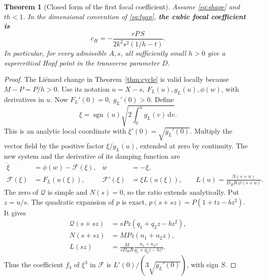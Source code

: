 \documentclass[12pt,a4paper,twoside,fleqn]{article}
\theoremstyle{journal}
\newtheorem{theorem}{Theorem}
\newcommand{\claim}[1]{{\normalfont\bfseries\boldmath #1}}
\newcommand{\dd}{\mathrm{d}}
\newcommand{\Q}{\mathcal Q}
\begin{document}
\begin{theorem}[Closed form of the first focal coefficient]\label{thm:focal}
Assume \eqref{eq:shape} and \(th<1\). In the dimensional convention of \eqref{eq:lyap}, \claim{the cubic focal coefficient is}
\begin{equation}\label{eq:closedc}
 c_H=-\frac{rP\,S}{2 k^2s^2(1/h-t)} .
\end{equation}
In particular, for every admissible \(A,s\), all sufficiently small \(h>0\) give a supercritical Hopf point in the transverse parameter \(D\).
\end{theorem}
\begin{proof}
The Li\'enard change in Theorem~\ref{thm:cycle} is valid locally because \(M-P=P/h>0\). Use its notation \(u=X-s,\ F_L(u),g_L(u),\phi(w)\), with derivatives in \(u\). Now \(F_L'(0)=0,\ g_L'(0)>0\). Define
\[
 \xi=\operatorname{sgn}(u)\sqrt{2\int_0^u g_L(v)\,\dd v}.
\]
This is an analytic local coordinate with \(\xi'(0)=\sqrt{g_L'(0)}\). Multiply the vector field by the positive factor \(\xi/g_L(u)\), extended at zero by continuity. The new system and the derivative of its damping function are
\begin{equation}\label{eq:odd}
 \begin{aligned}
 \dot\xi&=\phi(w)-\mathcal F(\xi), & \dot w&=-\xi,\\
 \mathcal F(\xi)&=F_L(u(\xi)), &
 \mathcal F'(\xi)&=\xi L(u(\xi)),\qquad L(u)=\frac{N(s+u)}{D_H R\,\Q(s+u)}.
 \end{aligned}
\end{equation}
The zero of \(\Q\) is simple and \(N(s)=0\), so the ratio extends analytically. Put \(z=u/s\). The quadratic expansion of \(p\) is exact, \(p(s+sz)=P(1+t z-bz^2)\). It gives
\begin{equation}\label{eq:ratio}
 \begin{aligned}
 \Q(s+sz)&=sPz(q_1+q_2 z-bz^2),\\
 N(s+sz)&=MPz(n_1+n_2 z),\\
 L(sz)&=\frac{M}{sD_H R}\frac{n_1+n_2 z}{q_1+q_2 z-bz^2}.
 \end{aligned}
\end{equation}
Thus the coefficient \(f_3\) of \(\xi^3\) in \(\mathcal F\) is \(L'(0)/(3\sqrt{g_L'(0)})\), with sign \(S\).


\end{proof}
\end{document}

